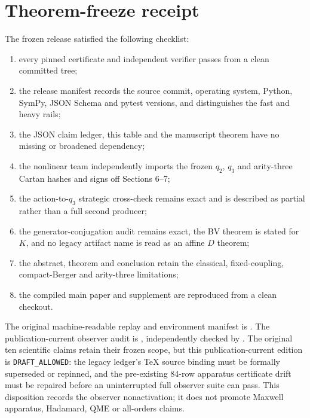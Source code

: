 \documentclass[11pt]{article}
\begin{document}
\section{Theorem-freeze receipt}

The frozen release satisfied the following checklist:
\begin{enumerate}
\item every pinned certificate and independent verifier passes from a clean
committed tree;
\item the release manifest records the source commit, operating system,
Python, SymPy, JSON Schema and pytest versions, and distinguishes the fast and
heavy rails;
\item the JSON claim ledger, this table and the manuscript theorem have no
missing or broadened dependency;
\item the nonlinear team independently imports the frozen $q_2$, $q_3$ and
arity-three Cartan hashes and signs off Sections 6--7;
\item the action-to-$q_3$ strategic cross-check remains exact and is described
as partial rather than a full second producer;
\item the generator-conjugation audit remains exact, the BV theorem is stated
for $K$, and no legacy artifact name is read as an affine $D$ theorem;
\item the abstract, theorem and conclusion retain the classical,
fixed-coupling, compact-Berger and arity-three limitations;
\item the compiled main paper and supplement are reproduced from a clean
checkout.
\end{enumerate}

The original machine-readable replay and environment manifest is
.
The publication-current observer audit is
, independently
checked by .  The original ten
scientific claims retain their frozen scope, but this publication-current
edition is \texttt{DRAFT\_ALLOWED}: the legacy ledger's TeX source binding
must be formally superseded or repinned, and the pre-existing 84-row apparatus
certificate drift must be repaired before an uninterrupted full observer
suite can pass.  This disposition records the observer nonactivation; it does
not promote Maxwell apparatus, Hadamard, QME or all-orders claims.
\end{document}
